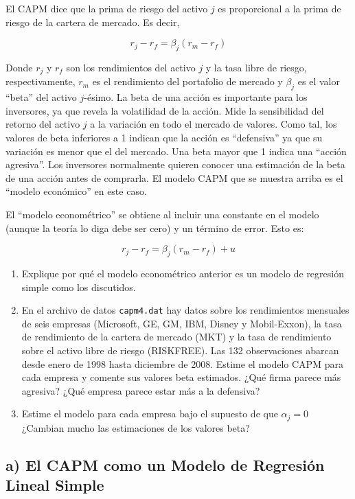 \documentclass[12pt]{article}
\begin{document}
El CAPM dice que la prima de riesgo del activo $j$ es proporcional a la prima de riesgo de la cartera de mercado. Es decir,

\[
r_j - r_f = \beta_j (r_m - r_f)
\]

Donde $r_j$ y $r_f$ son los rendimientos del activo $j$ y la tasa libre de riesgo, respectivamente, $r_m$ es el rendimiento del portafolio de mercado y $\beta_j$ es el valor ``beta'' del activo $j$-ésimo. La beta de una acción es importante para los inversores, ya que revela la volatilidad de la acción. Mide la sensibilidad del retorno del activo $j$ a la variación en todo el mercado de valores. Como tal, los valores de beta inferiores a 1 indican que la acción es ``defensiva'' ya que su variación es menor que el del mercado. Una beta mayor que 1 indica una ``acción agresiva''. Los inversores normalmente quieren conocer una estimación de la beta de una acción antes de comprarla. El modelo CAPM que se muestra arriba es el ``modelo económico'' en este caso. 

El ``modelo econométrico'' se obtiene al incluir una constante en el modelo (aunque la teoría lo diga debe ser cero) y un término de error. Esto es:

\[
r_j - r_f = \beta_j (r_m - r_f) + u
\]

\begin{enumerate}[label=\alph*)]
\item Explique por qué el modelo econométrico anterior es un modelo de regresión simple como los discutidos.
\item En el archivo de datos \texttt{capm4.dat} hay datos sobre los rendimientos mensuales de seis empresas (Microsoft, GE, GM, IBM, Disney y Mobil-Exxon), la tasa de rendimiento de la cartera de mercado (MKT) y la tasa de rendimiento sobre el activo libre de riesgo (RISKFREE). Las 132 observaciones abarcan desde enero de 1998 hasta diciembre de 2008. Estime el modelo CAPM para cada empresa y comente sus valores beta estimados. ¿Qué firma parece más agresiva? ¿Qué empresa parece estar más a la defensiva?
\item Estime el modelo para cada empresa bajo el supuesto de que $\alpha_j = 0$ ¿Cambian mucho las estimaciones de los valores beta?
\end{enumerate}

\subsection*{a) El CAPM como un Modelo de Regresión Lineal Simple}
\end{document}
